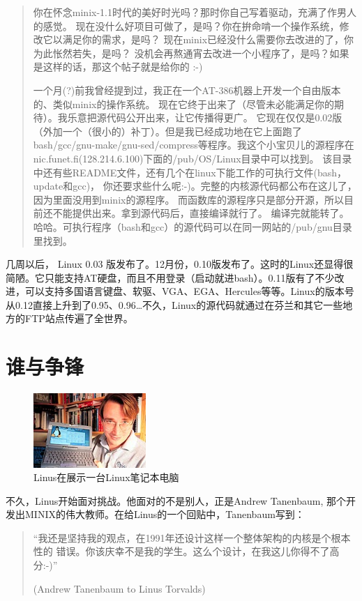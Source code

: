 \documentclass[12pt,a4paper]{article}
\begin{document}
\begin{quote}
你在怀念minix-1.1时代的美好时光吗？那时你自己写着驱动，充满了作男人的感觉。
现在没什么好项目可做了，是吗？你在拚命啃一个操作系统，修改它以满足你的需求，是吗？
现在minix已经没什么需要你去改进的了，你为此怅然若失，是吗？
没机会再熬通宵去改进一个小程序了，是吗？如果是这样的话，那这个帖子就是给你的 :-)

一个月(?)前我曾经提到过，我正在一个AT-386机器上开发一个自由版本的、类似minix的操作系统。
现在它终于出来了（尽管未必能满足你的期待）。我乐意把源代码公开出来，让它传播得更广。
它现在仅仅是0.02版（外加一个（很小的）补丁）。但是我已经成功地在它上面跑了
bash/gcc/gnu-make/gnu-sed/compress等程序。我这个小宝贝儿的源程序在
nic.funet.fi(128.214.6.100)下面的/pub/OS/Linux目录中可以找到。
该目录中还有些README文件，还有几个在linux下能工作的可执行文件(bash，update和gcc)，
你还要求些什么呢:-)。完整的内核源代码都公布在这儿了，因为里面没用到minix的源程序。
而函数库的源程序只是部分开源，所以目前还不能提供出来。拿到源代码后，直接编译就行了。
编译完就能转了。哈哈。可执行程序（bash和gcc）的源代码可以在同一网站的/pub/gnu目录里找到。
\end{quote}

几周以后， Linux 0.03 版发布了。12月份，0.10版发布了。这时的Linux还显得很简陋。它只能支持AT硬盘，而且不用登录（启动就进bash）。0.11版有了不少改进，可以支持多国语言键盘、软驱、VGA、EGA、Hercules等等。Linux的版本号从0.12直接上升到了0.95、0.96\ldots{}不久，Linux的源代码就通过在芬兰和其它一些地方的FTP站点传遍了全世界。
\section{谁与争锋}
\label{sec-3}

  
  \begin{figure}[h!]
  \centering
  \includegraphics[width=0.38\textwidth]{./figs/laptop.png}
  \caption{Linus在展示一台Linux笔记本电脑}
  \end{figure}
  
  不久，Linus开始面对挑战。他面对的不是别人，正是Andrew Tanenbaum, 那个开发出MINIX的伟大教师。在给Linus的一个回贴中，Tanenbaum写到：
\begin{quote}
“我还是坚持我的观点，在1991年还设计这样一个整体架构的内核是个根本性的 错误。你该庆幸不是我的学生。这么个设计，在我这儿你得不了高分:-)”

(Andrew Tanenbaum to Linus Torvalds)
\end{quote}
\end{document}

